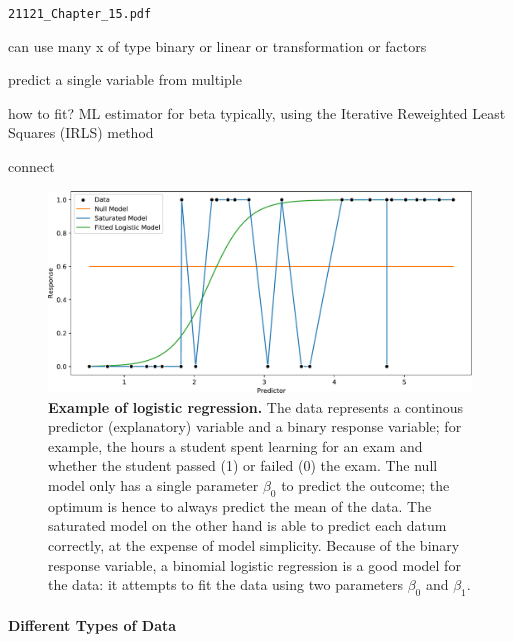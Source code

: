  \verb|21121_Chapter_15.pdf|

can use many x of type binary or linear or transformation or factors

predict a single variable from multiple


how to fit? ML estimator for beta
typically, using the Iterative Reweighted Least Squares (IRLS) method \cite{Burrus2012}


connect


\begin{figure}[!htb]
    \centering
    \includegraphics[width=\linewidth]{pdf/logistic_regression.pdf}
    \caption[Example of logistic regression]{
        \textbf{Example of logistic regression.}
        The data represents a continous predictor (explanatory) variable and a binary response variable;
        for example, the hours a student spent learning for an exam and whether the student passed (1) or failed (0) the exam.
        The null model only has a single parameter $\beta_0$ to predict the outcome;
        the optimum is hence to always predict the mean of the data.
        The saturated model on the other hand is able to predict each datum correctly,
        at the expense of model simplicity.
        Because of the binary response variable, a binomial logistic regression is a good model for the data:
        it attempts to fit the data using two parameters $\beta_0$ and $\beta_1$.
    }
    \label{fig:logistic_regression}
\end{figure}


\paragraph{Different Types of Data}
\label{sec:Factorization:sub:Methods:sub:GLMs:par:Data}

